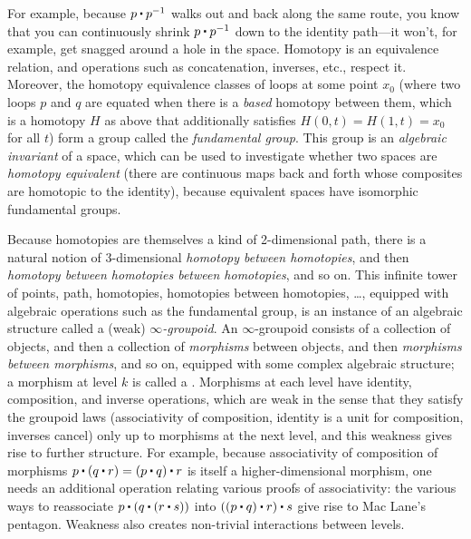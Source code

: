 For example, because
$p \ct \opp p$ walks out and back along the same route, you know that
you can continuously shrink $p \ct \opp p$ down to the identity
path---it won't, for example, get snagged around a hole in the space.
Homotopy is an equivalence relation, and operations such as
concatenation, inverses, etc., respect it.  Moreover, the homotopy
equivalence classes of loops at some point $x_0$ (where two loops $p$
and $q$ are equated when there is a \emph{based} homotopy between them,
which is a homotopy $H$ as above that additionally satisfies $H(0,t) =
H(1,t) = x_0$ for all $t$) form a group called the \emph{fundamental
  group}.  This group is an \emph{algebraic invariant} of a space, which
can be used to investigate whether two spaces are \emph{homotopy
  equivalent} (there are continuous maps back and forth whose composites
are homotopic to the identity), because equivalent spaces have
isomorphic fundamental groups.

Because homotopies are themselves a kind of 2-dimensional path, there is
a natural notion of 3-dimensional \emph{homotopy between homotopies},
and then \emph{homotopy between homotopies between homotopies}, and so
on.  This infinite tower of points, path, homotopies, homotopies between
homotopies, \ldots, equipped with algebraic operations such as the
fundamental group, is an instance of an algebraic structure called a
(weak) \emph{$\infty$-groupoid}.  An $\infty$-groupoid consists of a
collection of objects, and then a collection of \emph{morphisms} between
objects, and then \emph{morphisms between morphisms}, and so on,
equipped with some complex algebraic structure; a morphism at level $k$ is called a .  Morphisms at each level
have identity, composition, and inverse operations, which are weak in
the sense that they satisfy the groupoid laws (associativity of
composition, identity is a unit for composition, inverses cancel) only
up to morphisms at the next level, and this weakness gives rise to
further structure. For example, because associativity of composition of
morphisms $p \ct (q \ct r) = (p \ct q) \ct r$ is itself a
higher-dimensional morphism, one needs an additional operation relating
various proofs of associativity: the various ways to reassociate $p \ct
(q \ct (r \ct s))$ into $((p \ct q) \ct r) \ct s$ give rise to Mac
Lane's pentagon.  Weakness also creates non-trivial interactions between
levels.

